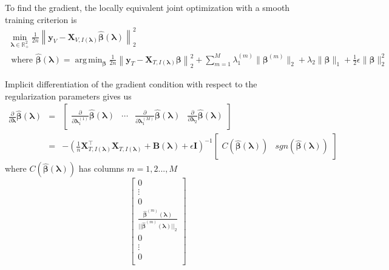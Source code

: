 \documentclass[10pt,letterpaper]{article}
\DeclareMathOperator*{\argmin}{arg\,min}
\begin{document}
To find the gradient, the locally equivalent joint optimization with a smooth training criterion is
\begin{equation}
\begin{array}{c}
\min_{\boldsymbol{\lambda} \in \mathbb{R}^2_{+}} \frac{1}{2n}
\left \| \boldsymbol{y}_V - \boldsymbol{X}_{V, I(\boldsymbol \lambda)} \hat{\boldsymbol{\beta}}(\boldsymbol{\lambda}) \right \|^2_2 \\
\text{ where }
\hat{\boldsymbol{\beta}}(\boldsymbol{\lambda}) =
\argmin_{\boldsymbol{\beta}} \frac{1}{2n} 
\left \| \boldsymbol{y}_T - \boldsymbol{X}_{T, I(\boldsymbol \lambda)} \boldsymbol{\beta} \right \|^2_2
+ \sum_{m=1}^M \lambda_1^{(m)} \| \boldsymbol\beta^{(m)} \|_2
+ \lambda_2 \| \boldsymbol\beta \|_1
+ \frac{1}{2} \epsilon \| \boldsymbol\beta \|_2^2
\end{array}
\label{eq:unpooledJointOpt}
\end{equation}

Implicit differentiation of the gradient condition with respect to the regularization parameters gives us 
\begin{equation}
\begin{array}{lcl}
\frac{\partial }{\partial \boldsymbol \lambda} \hat {\boldsymbol \beta}(\boldsymbol \lambda)
&=& \begin{bmatrix}
\frac{\partial}{\partial \boldsymbol \lambda_1^{(1)}}\hat {\boldsymbol \beta}(\boldsymbol \lambda) &
\cdots &
\frac{\partial}{\partial \boldsymbol \lambda_1^{(M)}}\hat {\boldsymbol \beta}(\boldsymbol \lambda) &
\frac{\partial}{\partial \boldsymbol \lambda_2}\hat {\boldsymbol \beta}(\boldsymbol \lambda)
\end{bmatrix}\\
&=& - \left (
\frac{1}{n} \boldsymbol X_{T, I(\boldsymbol \lambda)}^\top \boldsymbol X_{T, I(\boldsymbol \lambda)} + \boldsymbol B(\boldsymbol \lambda) + \epsilon \boldsymbol I
\right )^{-1}
\begin{bmatrix}
C(\hat{\boldsymbol \beta}(\boldsymbol \lambda)) & sgn(\hat {\boldsymbol \beta}(\boldsymbol \lambda))
\end{bmatrix}
\end{array}
\end{equation}
where $C(\hat {\boldsymbol \beta}(\boldsymbol \lambda))$ has columns $m=1,2...,M$
\begin{equation}
\begin{bmatrix}
0 \\
\vdots\\
0\\
\frac{\hat {\boldsymbol \beta}^{(m)}(\boldsymbol \lambda)}{||\hat{\boldsymbol \beta}^{(m)}(\boldsymbol \lambda)||_2}\\
0\\
\vdots\\
0\\
\end{bmatrix}
\end{equation}
\end{document}
